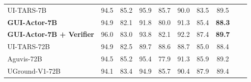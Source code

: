 \begin{table}[!t]
{\begin{tabular}{lccccccccl}
UI-TARS-7B & 94.5 & 85.2 & 95.9 & 85.7 & 90.0 & 83.5 & \cellcolor{lightblue}89.5 \\
\cellcolor{lightblue}\textbf{GUI-Actor-7B} & \cellcolor{lightblue}94.9 & \cellcolor{lightblue}82.1 & \cellcolor{lightblue}91.8 & \cellcolor{lightblue}80.0& \cellcolor{lightblue}91.3 & \cellcolor{lightblue}85.4 & \cellcolor{lightblue}\textbf{88.3} \\
\cellcolor{lightblue}\textbf{GUI-Actor-7B + Verifier} & 
\cellcolor{lightblue}96.0 & \cellcolor{lightblue}83.0 & \cellcolor{lightblue}93.8 & \cellcolor{lightblue}82.1 & \cellcolor{lightblue}92.2 & \cellcolor{lightblue}87.4 & \cellcolor{lightblue}\textbf{89.7} \\
\midrule
UI-TARS-72B & 94.9 & 82.5 & 89.7 & 88.6 & 88.7 & 85.0 & \cellcolor{lightblue}88.4 \\
Aguvis-72B & 94.5 & 85.2 & 95.4 & 77.9 & 91.3 & 85.9 & \cellcolor{lightblue}89.2 \\
UGround-V1-72B & 94.1 & 83.4 & 94.9 & 85.7 & 90.4 & 87.9 & \cellcolor{lightblue}89.4\\
\bottomrule
\end{tabular}
}
\label{tab:screenspot}
\end{table}